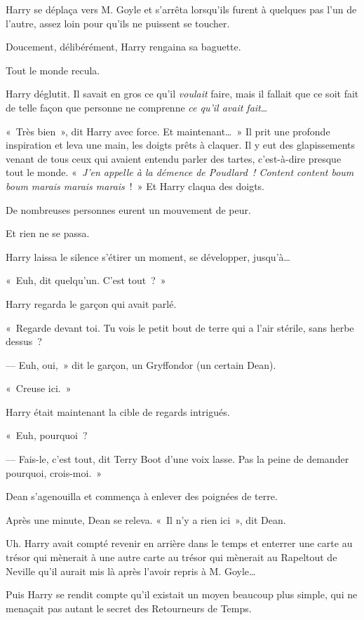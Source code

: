 Harry se déplaça vers M. Goyle et s'arrêta lorsqu'ils furent à quelques pas l'un de l'autre, assez loin pour qu'ils ne puissent se toucher.

Doucement, délibérément, Harry rengaina sa baguette.

Tout le monde recula.

Harry déglutit. Il savait en gros ce qu'il \emph{voulait} faire, mais il fallait que ce soit fait de telle façon que personne ne comprenne \emph{ce qu'il avait fait}…

«~Très bien~», dit Harry avec force. Et maintenant…~» Il prit une profonde inspiration et leva une main, les doigts prêts à claquer. Il y eut des glapissements venant de tous ceux qui avaient entendu parler des tartes, c'est-à-dire presque tout le monde. «~\emph{J'en appelle à la démence de Poudlard~! Content content boum boum marais marais marais}~!~» Et Harry claqua des doigts.

De nombreuses personnes eurent un mouvement de peur.

Et rien ne se passa.

Harry laissa le silence s'étirer un moment, se développer, jusqu'à…

«~Euh, dit quelqu'un. C'est tout~?~»

Harry regarda le garçon qui avait parlé.

«~Regarde devant toi. Tu vois le petit bout de terre qui a l'air stérile, sans herbe dessus~?

--- Euh, oui,~» dit le garçon, un Gryffondor (un certain Dean).

«~Creuse ici.~»

Harry était maintenant la cible de regards intrigués.

«~Euh, pourquoi~?

--- Fais-le, c'est tout, dit Terry Boot d'une voix lasse. Pas la peine de demander pourquoi, crois-moi.~»

Dean s'agenouilla et commença à enlever des poignées de terre.

Après une minute, Dean se releva. «~Il n'y a rien ici~», dit Dean.

Uh. Harry avait compté revenir en arrière dans le temps et enterrer une carte au trésor qui mènerait à une autre carte au trésor qui mènerait au Rapeltout de Neville qu'il aurait mis là après l'avoir repris à M. Goyle…

Puis Harry se rendit compte qu'il existait un moyen beaucoup plus simple, qui ne menaçait pas autant le secret des Retourneurs de Temps.

